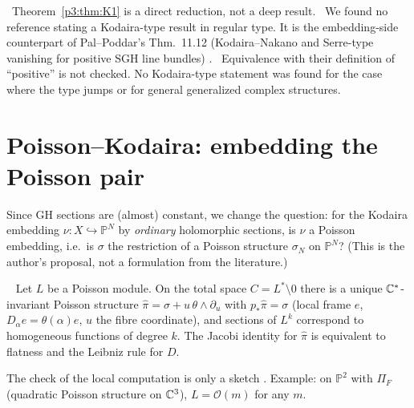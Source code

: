 \begin{rem}[Position]
\tP\ Theorem~\ref{p3:thm:K1} is a direct reduction, not a deep result. \tC\ We found no reference stating a Kodaira-type result in regular type. It is the embedding-side counterpart of Pal--Poddar's Thm.~11.12 (Kodaira--Nakano and Serre-type vanishing for positive SGH line bundles) \tC. \tQ\ Equivalence with their definition of ``positive'' is not checked. No Kodaira-type statement was found for the case where the type jumps or for general generalized complex structures.
\end{rem}

\section{Poisson--Kodaira: embedding the Poisson pair}\label{p3:sec:PK}
Since GH sections are (almost) constant, we change the question: for the Kodaira embedding $\nu:X\hookrightarrow\mathbb P^N$ by \emph{ordinary} holomorphic sections, is $\nu$ a Poisson embedding, i.e.\ is $\sigma$ the restriction of a Poisson structure $\sigma_N$ on $\mathbb P^N$? (This is the author's proposal, not a formulation from the literature.)

\begin{lem}\tP\ \tQ\label{p3:lem:lift}
Let $L$ be a Poisson module. On the total space $C=L^*\setminus0$ there is a unique $\mathbb C^*$-invariant Poisson structure $\hat\pi=\sigma+u\,\theta\wedge\partial_u$ with $p_*\hat\pi=\sigma$ (local frame $e$, $D_\alpha e=\theta(\alpha)e$, $u$ the fibre coordinate), and sections of $L^k$ correspond to homogeneous functions of degree $k$. The Jacobi identity for $\hat\pi$ is equivalent to flatness and the Leibniz rule for $D$.
\end{lem}
\noindent The check of the local computation is only a sketch \tQ. Example: on $\mathbb P^2$ with $\Pi_F$ (quadratic Poisson structure on $\mathbb C^3$), $L=\mathcal O(m)$ for any $m$.


